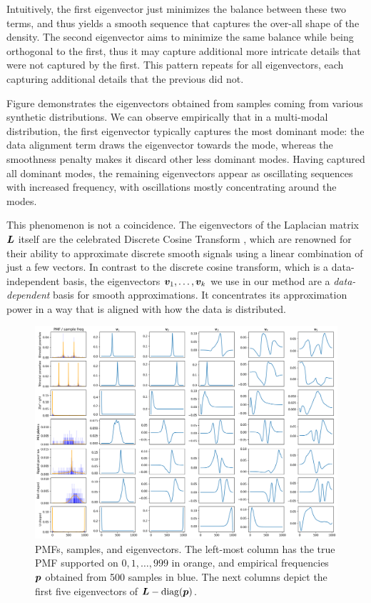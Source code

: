 \documentclass[10pt]{article} %
\DeclareMathOperator{\diag}{diag}
\begin{document}
Intuitively, the first eigenvector just minimizes the balance between these two terms, and thus yields a smooth sequence that captures the over-all shape of the density. The second eigenvector aims to minimize the same balance while being orthogonal to the first, thus it may capture additional more intricate details that were not captured by the first. This pattern repeats for all eigenvectors, each capturing additional details that the previous did not. 

Figure  demonstrates the eigenvectors obtained from samples coming from various synthetic distributions. We can observe empirically that in a multi-modal distribution, the first eigenvector typically captures the most dominant mode: the data alignment term draws the eigenvector towards the mode, whereas the smoothness penalty makes it discard other less dominant modes. Having captured all dominant modes, the remaining eigenvectors appear as oscillating sequences with increased frequency, with oscillations mostly concentrating around the modes.

This phenomenon is not a coincidence. The eigenvectors of the Laplacian matrix ${\bm{L}}$ itself are the celebrated Discrete Cosine Transform \citep{the_dct}, which are renowned for their ability to approximate discrete smooth signals using a linear combination of just a few vectors. In contrast to the discrete cosine transform, which is a data-independent basis, the eigenvectors ${\bm{v}}_1, \dots, {\bm{v}}_k$ we use in our method are a \emph{data-dependent} basis for smooth approximations. It concentrates its approximation power in a way that is aligned with how the data is distributed.

\begin{figure}[tbh]
    \centering
    \includegraphics[width=\textwidth]{eigenvectors}
    \caption{PMFs, samples, and eigenvectors. The left-most column has the true PMF supported on $0, 1, \dots, 999$ in orange, and empirical frequencies ${\bm{p}}$ obtained from 500 samples in blue. The next columns depict the first five eigenvectors of $\mL - \diag(\vp)$.}
    \label{fig:eigenvectors}
\end{figure}
\end{document}
